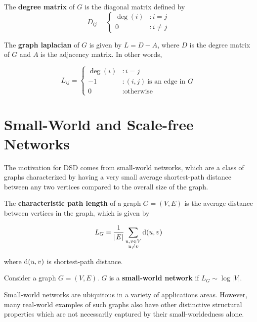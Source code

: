 \begin{definition}
  The \textbf{degree matrix} of $G$ is the diagonal matrix defined by
  \[
    D_{ij} = \begin{cases}
      \deg(i) &: i = j \\
      0 &: i \neq j
    \end{cases}
  \]
\end{definition}

\begin{definition}
  The \textbf{graph laplacian} of $G$ is given by $L = D - A$, where $D$ is the
  degree matrix of $G$ and $A$ is the adjacency matrix. In other words,

  \[
    L_{ij} = \begin{cases}
      \deg(i) &: i=j \\
      -1 &: (i,j) ~\text{is an edge in $G$} \\
      0 &: \text{otherwise}
    \end{cases}
  \]
\end{definition}

\section{Small-World and Scale-free Networks}

The motivation for DSD comes from small-world networks, which are a class of
graphs characterized by having a very small average shortest-path distance
between any two vertices compared to the overall size of the graph.


\begin{definition}
  The \textbf{characteristic path length} of a graph $G = (V,E)$ is the average
  distance between vertices in the graph, which is given by

  \[ L_G = \frac{1}{|E|} \sum_{\substack{u,v \in V \\ u \neq v}} \mathrm{d}(u,v)\]

  where $\mathrm{d}(u,v)$ is shortest-path distance. 
\end{definition}

\begin{definition}
  Consider a graph $G = (V,E)$. $G$ is a \textbf{small-world network} if
  $L_G \sim \log{|V|}$.
\end{definition}

Small-world networks are ubiquitous in a variety of applications areas. However,
many real-world examples of such graphs also have other distinctive structural
properties which are not necessarily captured by their small-worldedness alone.

